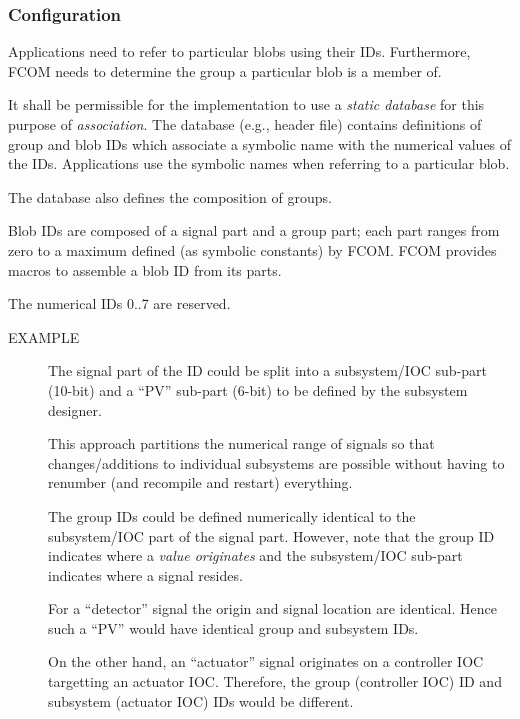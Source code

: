 \documentclass[11pt]{article}
\newcommand{\fcom}{FCOM}
\newcommand{\blob}{blob}
\newcommand{\Blob}{Blob}
\newcommand{\group}{group}
\newcommand{\signal}{signal}
\newcommand{\example}[1]{
	\begin{description}
		\item[EXAMPLE] #1
	\end{description}
}
\begin{document}
	\subsubsection{Configuration}
		Applications need to refer to particular \blob{}s using
        their IDs. Furthermore, \fcom{} needs to determine
        the \group{} a particular \blob{} is a member of.

        It shall be permissible for the implementation
        to use a {\em static database} for this purpose
        of {\em association}. The database (e.g., header file)
        contains definitions of \group{} and \blob{} IDs
        which associate a symbolic name with the numerical
        values of the IDs. Applications use the symbolic
        names when referring to a particular \blob{}.

        The database also defines the composition of \group{}s.

        \Blob{} IDs are composed of a \signal{} part and a \group{}
        part; each part ranges from zero to a maximum defined
        (as symbolic constants) by \fcom. \fcom{} provides
        macros to assemble a \blob{} ID from its parts.

        The numerical IDs 0..7 are reserved.
        
		\example{The \signal{} part of the ID could be split
          into a subsystem/IOC sub-part (10-bit) and a ``PV'' sub-part
          (6-bit) to be defined by the subsystem designer.

          This approach partitions the numerical range of
          \signal{}s so that changes/additions to individual
          subsystems are possible without having to renumber
          (and recompile and restart) everything.

          The \group{} IDs could be defined numerically identical
          to the subsystem/IOC part of the \signal{} part.
          However, note that the \group{} ID indicates
          where a {\em value originates} and the subsystem/IOC
          sub-part indicates where a \signal{} resides.

          For a ``detector'' \signal{} the origin and \signal{}
          location are identical. Hence such a ``PV'' would have identical
          \group{} and subsystem IDs.

          On the other hand, an ``actuator'' \signal{} originates
          on a controller IOC targetting an actuator IOC.
          Therefore, the \group{} (controller IOC) ID and
          subsystem (actuator IOC) IDs would
          be different.
        }
\end{document}
